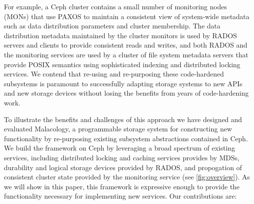 \documentclass[10pt,twocolumn]{article}
\begin{document}
For example, a Ceph cluster contains a small number of
monitoring nodes (MONs) that use PAXOS to maintain a consistent view of
system-wide metadata such as data distribution parameters and cluster
membership. The data distribution metadata maintained by
the cluster monitors is used by RADOS servers and clients to provide
consistent reads and writes, and both RADOS and the monitoring services
are used by a cluster of file system metadata servers that provide POSIX
semantics using sophisticated indexing and distributed locking services.
We contend that re-using and re-purposing these code-hardened subsystems
is paramount to successfully adapting storage systems to new APIs and
new storage devices without losing the benefits from years of
code-hardening work.

To illustrate the benefits and challenges of this approach we have
designed and evaluated Malacology, a programmable storage system for
constructing new functionality by re-purposing existing subsystem
abstractions contained in Ceph. We build the framework on Ceph by
leveraging a broad spectrum of existing services, including distributed
locking and caching services provides by MDSs, durability and logical
storage devices provided by RADOS, and propogation of consistent cluster
state provided by the monitoring service (see \ref{fig:overview}). As we will show in this paper, this framework is expressive enough to provide the
functionality necessary for implementing new services. Our contributions
are:

\paragraph{}
\end{document}
